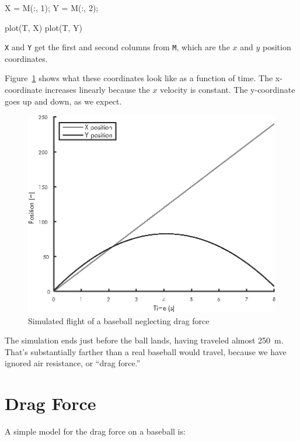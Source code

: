\begin{code}
    X = M(:, 1);
    Y = M(:, 2);
    
    plot(T, X)
    plot(T, Y)
\end{code}

\lstinline{X} and \lstinline{Y} get the first and second columns from \lstinline{M}, which are the $x$ and $y$ position coordinates.


Figure~\ref{fig:baseball1} shows what these coordinates look like as a function of time.  The x-coordinate increases linearly because the $x$ velocity is constant.  The y-coordinate goes up and down, as we expect.

\begin{figure}[ht]
\includegraphics{book/images/figure12_02_new.eps}
\caption{Simulated flight of a baseball neglecting drag force}
\label{fig:baseball1}
\end{figure}

The simulation ends just before the ball lands, having traveled almost \SI{250}{\meter}.  That's substantially farther than a real baseball would travel, because we have ignored air resistance, or ``drag force.''


\section{Drag Force}
\label{drag}


A simple model for the drag force on a baseball is:

